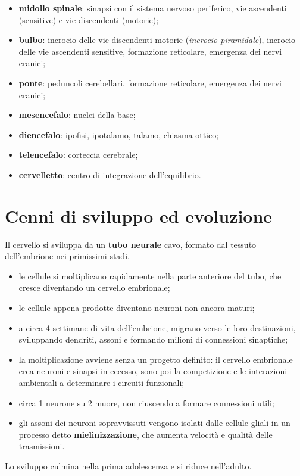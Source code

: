 \begin{itemize}
  \item \textbf{midollo spinale}: sinapsi con il sistema nervoso periferico,
    vie ascendenti (sensitive) e vie discendenti (motorie);
  \item \textbf{bulbo}: incrocio delle vie discendenti motorie (\textit{incrocio
    piramidale}), incrocio delle vie ascendenti sensitive, formazione
    reticolare, emergenza dei nervi cranici;
  \item \textbf{ponte}: peduncoli cerebellari, formazione reticolare,
    emergenza dei nervi cranici;
  \item \textbf{mesencefalo}: nuclei della base;
  \item \textbf{diencefalo}: ipofisi, ipotalamo, talamo, chiasma ottico;
  \item \textbf{telencefalo}: corteccia cerebrale;
  \item \textbf{cervelletto}: centro di integrazione dell'equilibrio.
\end{itemize}

\section{Cenni di sviluppo ed evoluzione}

Il cervello si sviluppa da un \textbf{tubo neurale} cavo, formato dal tessuto
dell'embrione nei primissimi stadi.
\begin{itemize}
  \item le cellule si moltiplicano rapidamente nella parte anteriore del
    tubo, che cresce diventando un cervello embrionale;
  \item le cellule appena prodotte diventano neuroni non ancora maturi;
  \item a circa 4 settimane di vita dell'embrione, migrano verso le loro
    destinazioni, sviluppando dendriti, assoni e formando milioni di
    connessioni sinaptiche;
  \item la moltiplicazione avviene senza un progetto definito: il cervello
    embrionale crea neuroni e sinapsi in eccesso, sono poi la competizione e
    le interazioni ambientali a determinare i circuiti funzionali;
  \item circa 1 neurone su 2 muore, non riuscendo a formare connessioni
    utili;
  \item gli assoni dei neuroni sopravvissuti vengono isolati dalle cellule
    gliali in un processo detto \textbf{mielinizzazione}, che aumenta
    velocità e qualità delle trasmissioni.
\end{itemize}
Lo sviluppo culmina nella prima adolescenza e si riduce nell'adulto.

